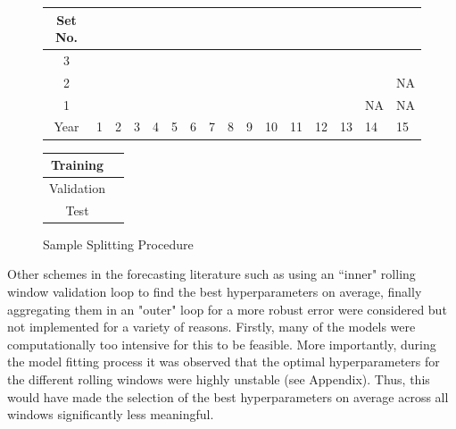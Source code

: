 \documentclass[11pt, a4paper, table]{article}
\begin{document}
\begin{figure}
	\begin{center}
		\begin{tabular}{|c|p{0.40cm}p{0.40cm}p{0.40cm}p{0.40cm}p{0.40cm}p{0.40cm}p{0.40cm}p{0.40cm}p{0.40cm}p{0.40cm}p{0.40cm}p{0.40cm}p{0.40cm}p{0.40cm}p{0.40cm}|}
			\hline
			Set No. &&&&&&&&&&&&&&& \\
			\hline
			3 & \cellcolor{cyan} & \cellcolor{cyan} & \cellcolor{cyan} & \cellcolor{cyan} & \cellcolor{cyan} & \cellcolor{cyan} & \cellcolor{cyan} & \cellcolor{cyan} & \cellcolor{cyan} &
			\cellcolor{pink} & \cellcolor{pink} & \cellcolor{pink} & \cellcolor{pink} & \cellcolor{pink} & 	
			\cellcolor{olive} \\
			2 & \cellcolor{cyan} & \cellcolor{cyan} & \cellcolor{cyan} & \cellcolor{cyan} & \cellcolor{cyan} & \cellcolor{cyan} & \cellcolor{cyan} & \cellcolor{cyan} &
			\cellcolor{pink} & \cellcolor{pink} & \cellcolor{pink} & \cellcolor{pink} & \cellcolor{pink} & 	
			\cellcolor{olive} & NA  \\
			1 & \cellcolor{cyan} & \cellcolor{cyan} & \cellcolor{cyan} & \cellcolor{cyan} & \cellcolor{cyan} & \cellcolor{cyan} & \cellcolor{cyan} &
			\cellcolor{pink} & \cellcolor{pink} & \cellcolor{pink} & \cellcolor{pink} & \cellcolor{pink} & 	
			\cellcolor{olive} & NA & NA \\
			\hline
			Year & 1 & 2 & 3 & 4 & 5 & 6 & 7 & 8 & 9 & 10 & 11 & 12 & 13 & 14 & 15\\
			\hline
		\end{tabular}
		\medskip
		\begin{tabular}{|c|p{0.40cm}|}
			\hline
			Training & \cellcolor{cyan} \\
			\hline
			Validation & \cellcolor{pink} \\
			\hline
			Test & \cellcolor{olive} \\
			\hline
		\end{tabular}
	\end{center}
	\caption{Sample Splitting Procedure}
	\label{sample_split_diag}
\end{figure}

Other schemes in the forecasting literature such as using an ``inner" rolling window validation loop to find the best hyperparameters on average, finally aggregating them in an "outer" loop for a more robust error were considered but not implemented for a variety of reasons. Firstly, many of the models were computationally too intensive for this to be feasible. More importantly, during the model fitting process it was observed that the optimal hyperparameters for the different rolling windows were highly unstable (see Appendix). Thus, this would have made the selection of the best hyperparameters on average across all windows significantly less meaningful.
\end{document}
